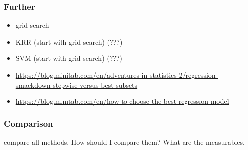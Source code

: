 
\subsubsection{Further}
\begin{itemize}
    \item grid search
    \item KRR (start with grid search) (???)
    \item SVM (start with grid search) (???)
    \item \url{https://blog.minitab.com/en/adventures-in-statistics-2/regression-smackdown-stepwise-versus-best-subsets}
    \item \url{https://blog.minitab.com/en/how-to-choose-the-best-regression-model}
\end{itemize}

\subsubsection{Comparison} 
compare all methods. 
How should I compare them? 
What are the measurables. 


